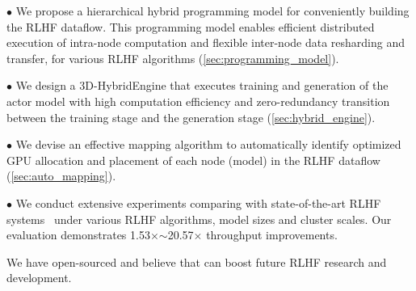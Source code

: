 \noindent$\bullet$ We propose a hierarchical hybrid programming model for conveniently building the RLHF dataflow. This programming model enables efficient distributed execution of intra-node computation and flexible inter-node data resharding and transfer, for %
various RLHF algorithms (\textsection\ref{sec:programming_model}). 


\noindent$\bullet$ We design a 3D-HybridEngine that executes training and generation of the actor model with high computation efficiency and zero-redundancy transition between the training stage and the generation stage %
(\textsection\ref{sec:hybrid_engine}).

\noindent$\bullet$ We devise an effective mapping algorithm to automatically identify optimized %
GPU allocation and placement of each node (model) in the RLHF dataflow %
(\textsection\ref{sec:auto_mapping}).


\noindent$\bullet$ 
We conduct extensive experiments comparing \sysname{} with state-of-the-art RLHF systems~\cite{hu23openrlhf, yao2023deepspeedchat, NeMoAligner} under various RLHF algorithms, model sizes and %
cluster scales. %
Our evaluation 
demonstrates 1.53$\times$$\sim$20.57$\times$ throughput improvements.

We have open-sourced \sysname{} and believe that \sysname{} can boost future RLHF research and development.






